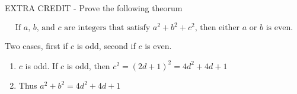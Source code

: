 \documentclass[a4paper,11pt]{article}
\newcommand{\answer}{\textbf{Answer : }}
\begin{document}



 \item EXTRA CREDIT - Prove the following theorum

 \[ \text{If $a$, $b$, and $c$ are integers that satisfy $a^2 + b^2 + c^2$, then either $a$ or $b$ is even.} \]

 Two cases, first if $c$ is odd, second if $c$ is even.

 \begin{enumerate}
 \item $c$ is odd. If $c$ is odd, then $c^2 = (2d+1)^2 = 4d^2+4d+1$
 \item Thus $a^2 + b^2 = 4d^2+4d+1$
\end{enumerate}
\end{document}
